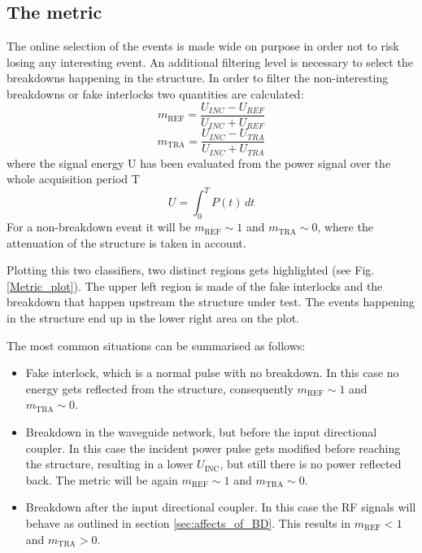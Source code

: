 \subsection[The metric]{The metric}

The online selection of the events is made wide on purpose in order not to risk losing any interesting event. An additional filtering level is necessary to select the breakdowns happening in the structure. In order to filter the non-interesting breakdowns or fake interlocks two quantities are calculated:
\begin{equation}
m_{\text{REF}}  =  \frac{ U_{INC} -  U_{REF}   }{  U_{INC} + U_{REF}   }
\end{equation}
\begin{equation}
m_{\text{TRA}}  =  \frac{ U_{INC} -  U_{TRA}   }{  U_{INC} +  U_{TRA}   }
\end{equation}
where the signal energy U has been evaluated from the power signal over the whole acquisition period T
\begin{equation}
U = \int_0^T P(t) \, dt
\end{equation}
For a non-breakdown event it will be $m_{\text{REF}} \sim 1$ and $m_{\text{TRA}} \sim 0$, where the attenuation of the structure is taken in account.

Plotting this two classifiers, two distinct regions gets highlighted (see Fig. \ref{Metric_plot}). The upper left region is made of the fake interlocks and the breakdown that happen upstream the structure under test. The events happening in the structure end up in the lower right area on the plot. 

The most common situations can be summarised as follows:
\begin{itemize}
\item Fake interlock, which is a normal pulse with no breakdown. In this case no energy gets reflected from the structure, consequently $m_\text{REF} \sim 1$ and  $m_\text{TRA} \sim 0$.
\item Breakdown in the waveguide network, but before the input directional coupler. In this case the incident power pulse gets modified before reaching the structure, resulting in a lower $U_\text{INC}$, but still there is no power reflected back. The metric will be again $m_\text{REF} \sim 1$ and  $m_\text{TRA} \sim 0$.
\item Breakdown after the input directional coupler. In this case the RF signals will behave as outlined in section \ref{sec:affects_of_BD}. This results in $m_\text{REF} <1$ and  $m_\text{TRA} > 0$.
\end{itemize}

